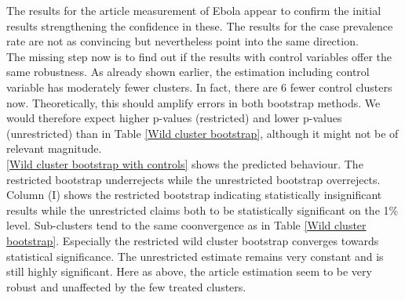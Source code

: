 \documentclass{article}
\begin{document}
The results for the article measurement of Ebola appear to confirm the initial results strengthening the confidence in these. The results for the case prevalence rate are not as convincing but nevertheless point into the same direction. \\
The missing step now is to find out if the results with control variables offer the same robustness. As already shown earlier, the estimation including control variable has moderately fewer clusters. In fact, there are 6 fewer control clusters now. Theoretically, this should amplify errors in both bootstrap methods. We would therefore expect higher p-values (restricted) and lower p-values (unrestricted) than in Table \ref{Wild cluster bootstrap}, although it might not be of relevant magnitude. \\
\ref{Wild cluster bootstrap with controls} shows the predicted behaviour. The restricted bootstrap underrejects while the unrestricted bootstrap overrejects. Column (I) shows the restricted bootstrap indicating statistically insignificant results while the unrestricted claims both to be statistically significant on the 1\% level. Sub-clusters tend to the same coonvergence as in Table \ref{Wild cluster bootstrap}. Especially the restricted wild cluster bootstrap converges towards statistical significance. The unrestricted estimate remains very constant and is still highly significant. Here as above, the article estimation seem to be very robust and unaffected by the few treated clusters.\\
\end{document}

